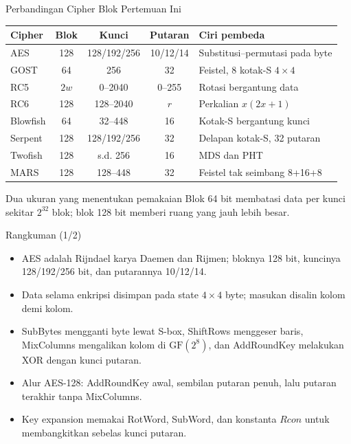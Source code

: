 \documentclass[aspectratio=169,11pt]{beamer}
\begin{document}
\begin{frame}{Perbandingan Cipher Blok Pertemuan Ini}
    \scriptsize
    \begin{tabularx}{\linewidth}{@{}l c c c >{\raggedright\arraybackslash}X@{}}
        \toprule
        \textbf{Cipher} & \textbf{Blok} & \textbf{Kunci} & \textbf{Putaran} &
        \textbf{Ciri pembeda} \\
        \midrule
        AES & 128 & 128/192/256 & 10/12/14 & Substitusi--permutasi pada byte \\
        GOST & 64 & 256 & 32 & Feistel, 8 kotak-S $4 \times 4$ \\
        RC5 & $2w$ & 0--2040 & 0--255 & Rotasi bergantung data \\
        RC6 & 128 & 128--2040 & $r$ & Perkalian $x(2x+1)$ \\
        Blowfish & 64 & 32--448 & 16 & Kotak-S bergantung kunci \\
        Serpent & 128 & 128/192/256 & 32 & Delapan kotak-S, 32 putaran \\
        Twofish & 128 & s.d. 256 & 16 & MDS dan PHT \\
        MARS & 128 & 128--448 & 32 & Feistel tak seimbang 8+16+8 \\
        \bottomrule
    \end{tabularx}
    \vspace{0.15cm}
    \begin{alertblock}{Dua ukuran yang menentukan pemakaian}
        \footnotesize
        Blok 64 bit membatasi data per kunci sekitar $2^{32}$ blok;
        blok 128 bit memberi ruang yang jauh lebih besar.
    \end{alertblock}
\end{frame}

\begin{frame}{Rangkuman (1/2)}
    \footnotesize
    \begin{itemize}
        \item AES adalah Rijndael karya Daemen dan Rijmen; bloknya 128 bit,
              kuncinya 128/192/256 bit, dan putarannya 10/12/14.
        \item Data selama enkripsi disimpan pada state $4 \times 4$ byte;
              masukan disalin kolom demi kolom.
        \item SubBytes mengganti byte lewat S-box, ShiftRows menggeser
              baris, MixColumns mengalikan kolom di $\text{GF}(2^8)$, dan
              AddRoundKey melakukan XOR dengan kunci putaran.
        \item Alur AES-128: AddRoundKey awal, sembilan putaran penuh, lalu
              putaran terakhir tanpa MixColumns.
        \item Key expansion memakai RotWord, SubWord, dan konstanta
              $Rcon$ untuk membangkitkan sebelas kunci putaran.
    \end{itemize}
\end{frame}
\end{document}
